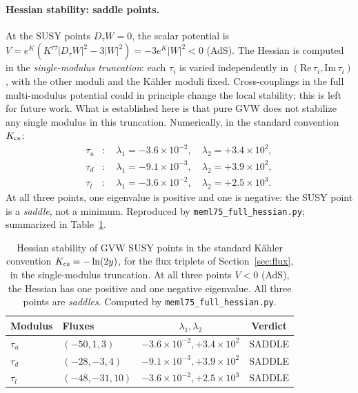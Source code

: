 \documentclass[12pt,a4paper]{article}
\numberwithin{equation}{section}
\begin{document}
\paragraph{Hessian stability: saddle points.}
At the SUSY points \(D_\tau W = 0\), the scalar potential is
\(V = e^K(K^{\tau\bar\tau}|D_\tau W|^2 - 3|W|^2) = -3e^K|W|^2 < 0\)
(AdS). The Hessian is computed in the \emph{single-modulus truncation}:
each \(\tau_i\) is varied independently in
\((\mathrm{Re}\,\tau_i, \mathrm{Im}\,\tau_i)\), with the other moduli
and the K\"ahler moduli fixed. Cross-couplings in the full
multi-modulus potential could in principle change the local stability;
this is left for future work. What is established here is that pure
GVW does not stabilize any single modulus in this truncation.
Numerically, in the standard convention \(K_{\rm cs}\):
\begin{equation}
\begin{aligned}
\tau_u &: \quad \lambda_1 = -3.6\times10^{-2}, \quad \lambda_2 = +3.4\times10^2, \\
\tau_d &: \quad \lambda_1 = -9.1\times10^{-3}, \quad \lambda_2 = +3.9\times10^2, \\
\tau_l &: \quad \lambda_1 = -3.6\times10^{-2}, \quad \lambda_2 = +2.5\times10^3.
\end{aligned}
\end{equation}
At all three points, one eigenvalue is positive and one is negative:
the SUSY point is a \emph{saddle}, not a minimum.
Reproduced by \texttt{meml75\_full\_hessian.py};
summarized in Table~\ref{tab:hessian_cs}.

\begin{table}[H]
\centering
\caption{Hessian stability of GVW SUSY points in the standard
K\"ahler convention \(K_{\rm cs}=-\ln(2y)\), for the flux triplets
of Section~\ref{sec:flux}, in the single-modulus truncation. At all
three points \(V<0\) (AdS), the Hessian has one positive and one
negative eigenvalue. All three points are \emph{saddles}. Computed by
\texttt{meml75\_full\_hessian.py}.}
\label{tab:hessian_cs}
\begin{tabular}{llcc}
\toprule
Modulus & Fluxes & \(\lambda_1, \lambda_2\) & Verdict \\
\midrule
\(\tau_u\) & \((-50, 1, 3)\) & \(-3.6\times10^{-2}, +3.4\times10^2\) & SADDLE \\
\(\tau_d\) & \((-28,-3, 4)\) & \(-9.1\times10^{-3}, +3.9\times10^2\) & SADDLE \\
\(\tau_l\) & \((-48,-31,10)\) & \(-3.6\times10^{-2}, +2.5\times10^3\) & SADDLE \\
\bottomrule
\end{tabular}
\end{table}
\end{document}

